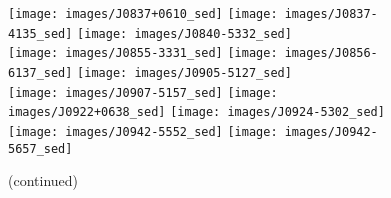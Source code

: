\documentclass{pasa}%
\begin{document}
\begin{figure*}\ContinuedFloat
\texttt{[image: images/J0837+0610\_sed]}\hspace*{-0.5em}%
\hspace*{-0.5em}\texttt{[image: images/J0837-4135\_sed]}\hspace*{-0.5em}%
\hspace*{-0.5em}\texttt{[image: images/J0840-5332\_sed]} \\[-0.6em]
\texttt{[image: images/J0855-3331\_sed]}\hspace*{-0.5em}%
\hspace*{-0.5em}\texttt{[image: images/J0856-6137\_sed]}\hspace*{-0.5em}%
\hspace*{-0.5em}\texttt{[image: images/J0905-5127\_sed]} \\[-0.6em]
\texttt{[image: images/J0907-5157\_sed]}\hspace*{-0.5em}%
\hspace*{-0.5em}\texttt{[image: images/J0922+0638\_sed]}\hspace*{-0.5em}%
\hspace*{-0.5em}\texttt{[image: images/J0924-5302\_sed]} \\[-0.6em]
\texttt{[image: images/J0942-5552\_sed]}\hspace*{-0.5em}%
\hspace*{-0.5em}\texttt{[image: images/J0942-5657\_sed]}\hspace*{-0.5em}%
\\
\caption{(continued)}
\end{figure*}
\end{document}
